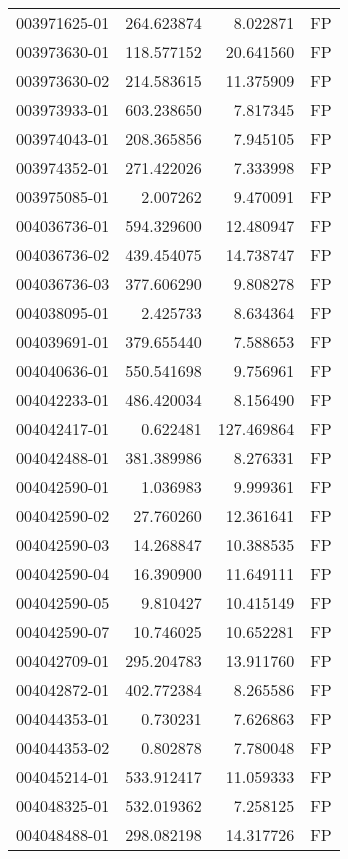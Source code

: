 \begin{tabular}{lrrl}
003971625-01 &  264.623874 &     8.022871 &   FP \\
003973630-01 &  118.577152 &    20.641560 &   FP \\
003973630-02 &  214.583615 &    11.375909 &   FP \\
003973933-01 &  603.238650 &     7.817345 &   FP \\
003974043-01 &  208.365856 &     7.945105 &   FP \\
003974352-01 &  271.422026 &     7.333998 &   FP \\
003975085-01 &    2.007262 &     9.470091 &   FP \\
004036736-01 &  594.329600 &    12.480947 &   FP \\
004036736-02 &  439.454075 &    14.738747 &   FP \\
004036736-03 &  377.606290 &     9.808278 &   FP \\
004038095-01 &    2.425733 &     8.634364 &   FP \\
004039691-01 &  379.655440 &     7.588653 &   FP \\
004040636-01 &  550.541698 &     9.756961 &   FP \\
004042233-01 &  486.420034 &     8.156490 &   FP \\
004042417-01 &    0.622481 &   127.469864 &   FP \\
004042488-01 &  381.389986 &     8.276331 &   FP \\
004042590-01 &    1.036983 &     9.999361 &   FP \\
004042590-02 &   27.760260 &    12.361641 &   FP \\
004042590-03 &   14.268847 &    10.388535 &   FP \\
004042590-04 &   16.390900 &    11.649111 &   FP \\
004042590-05 &    9.810427 &    10.415149 &   FP \\
004042590-07 &   10.746025 &    10.652281 &   FP \\
004042709-01 &  295.204783 &    13.911760 &   FP \\
004042872-01 &  402.772384 &     8.265586 &   FP \\
004044353-01 &    0.730231 &     7.626863 &   FP \\
004044353-02 &    0.802878 &     7.780048 &   FP \\
004045214-01 &  533.912417 &    11.059333 &   FP \\
004048325-01 &  532.019362 &     7.258125 &   FP \\
004048488-01 &  298.082198 &    14.317726 &   FP \\

\end{tabular}
